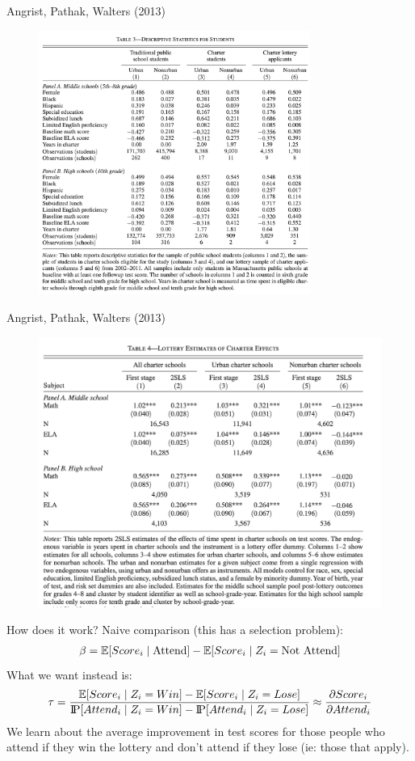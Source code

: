 \begin{frame}{Angrist, Pathak, Walters (2013)}
\begin{figure}
\centering
\includegraphics[width=3.5in]{./resources/apw_2.png}
\end{figure}
\end{frame}

\begin{frame}{Angrist, Pathak, Walters (2013)}
\begin{figure}
\centering
\includegraphics[width=4.5in]{./resources/apw_3.png}
\end{figure}
\end{frame}

\begin{frame}{How does it work?}
Naive comparison (this has a selection problem):
\begin{align*}
\beta = \mathbb{E}[Score_i \mid \text{Attend}] - \mathbb{E}[Score_i \mid Z_i = \text{Not Attend}] 
\end{align*}
What we want instead is:
\begin{align*}
\tau = \frac{\mathbb{E}[Score_i \mid Z_i = Win] - \mathbb{E}[Score_i \mid Z_i = Lose]}{\text{I\kern-0.15em P}[Attend_i \mid Z_i = Win] - \text{I\kern-0.15em P}[Attend_i \mid Z_i = Lose]} \approx \frac{\partial Score_i}{\partial Attend_i}
\end{align*}
We learn about the average improvement in test scores for those people who attend if they win the lottery and don't attend if they lose (ie: those that apply).\\
\end{frame}

